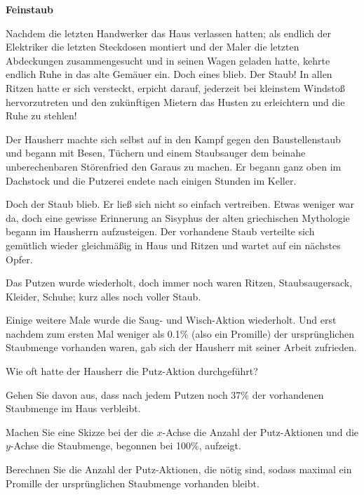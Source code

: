 \bbwActAufgabenNr{} \textbf{Feinstaub}

Nachdem die letzten Handwerker das Haus verlassen hatten; als endlich der
Elektriker die letzten Steckdosen montiert und der Maler die letzten
Abdeckungen zusammengesucht und in seinen Wagen geladen hatte, kehrte
endlich Ruhe in das alte Gemäuer ein. Doch eines blieb. Der Staub!
In allen Ritzen hatte er sich versteckt, erpicht darauf,
jederzeit bei kleinstem Windstoß hervorzutreten und den zukünftigen
Mietern das Husten zu erleichtern und die Ruhe zu stehlen!

Der Hausherr machte sich selbst auf in den Kampf gegen den Baustellenstaub und
begann mit Besen, Tüchern und einem Staubsauger dem beinahe
unberechenbaren Störenfried den Garaus zu machen. Er begann ganz oben
im Dachstock und die Putzerei endete nach einigen Stunden im Keller.

Doch der Staub blieb. Er ließ sich nicht so einfach vertreiben. Etwas
weniger war da, doch eine gewisse Erinnerung an Sisyphus der alten
griechischen Mythologie begann im Hausherrn aufzusteigen. Der
vorhandene Staub verteilte sich gemütlich wieder gleichmäßig in Haus
und Ritzen und wartet auf ein nächstes Opfer.

Das Putzen wurde wiederholt, doch immer noch waren Ritzen,
Staubsaugersack, Kleider, Schuhe; kurz alles noch voller Staub.

Einige weitere Male wurde die Saug- und Wisch-Aktion wiederholt. Und
erst nachdem zum ersten Mal weniger als 0.1\% (also ein Promille) der ursprünglichen
Staubmenge vorhanden waren, gab sich der Hausherr mit seiner Arbeit
zufrieden.

Wie oft hatte der Hausherr die Putz-Aktion durchgeführt?

Gehen Sie davon aus, dass nach jedem Putzen noch 37\% der vorhandenen
Staubmenge im Haus verbleibt.

\begin{bbwAufgabenBlock}

\item Machen Sie eine Skizze bei der die $x$-Achse die Anzahl der
  Putz-Aktionen und die $y$-Achse die Staubmenge, begonnen bei 100\%,
  aufzeigt.
  
\item Berechnen Sie die Anzahl der Putz-Aktionen, die nötig sind,
    sodass maximal ein Promille der ursprünglichen Staubmenge
    vorhanden bleibt.

\end{bbwAufgabenBlock}
\platzFuerBerechnungenBisEndeSeite{}



\newpage
